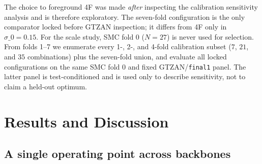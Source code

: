 \documentclass{article}
\begin{document}
The choice to foreground 4F was made \emph{after} inspecting the calibration sensitivity analysis and is therefore exploratory. The seven-fold configuration is the only comparator locked before GTZAN inspection; it differs from 4F only in $\sigma\_0=0.15$. For the scale study, SMC fold 0 ($N=27$) is never used for selection. From folds 1--7 we enumerate every 1-, 2-, and 4-fold calibration subset ($7$, $21$, and $35$ combinations) plus the seven-fold union, and evaluate all locked configurations on the same SMC fold 0 and fixed GTZAN/\texttt{final1} panel. The latter panel is test-conditioned and is used only to describe sensitivity, not to claim a held-out optimum.

\section{Results and Discussion}
\label{sec:results}

\subsection{A single operating point across backbones}
\end{document}
